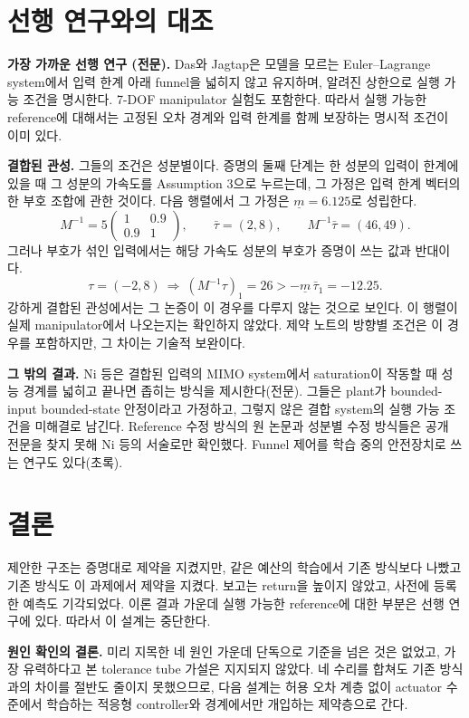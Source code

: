 \documentclass[11pt]{article}\usepackage[margin=1in]{geometry}\usepackage{amsmath,amssymb,amsthm,mathtools}\usepackage{graphicx}\graphicspath{{figures/}{../figures/}{figs/}{./}}\usepackage{enumitem}\usepackage{hyperref}\usepackage{cleveref}\usepackage{tikz}\usetikzlibrary{arrows.meta,positioning,calc,shapes.geometric}\usepackage{float}\usepackage[most]{tcolorbox}\usepackage{kotex}\usepackage{booktabs}\emergencystretch=1.6em\tolerance=2000 \crefname{assumption}{Assumption}{Assumptions}\Crefname{assumption}{Assumption}{Assumptions}\crefname{definition}{Definition}{Definitions}\Crefname{definition}{Definition}{Definitions}\crefname{proposition}{Proposition}{Propositions}\Crefname{proposition}{Proposition}{Propositions}\crefname{fact}{Fact}{Facts}\Crefname{fact}{Fact}{Facts} \newtheorem{assumption}{Assumption}\newtheorem{definition}{Definition}\newtheorem{lemma}{Lemma}\newtheorem{proposition}{Proposition}\newtheorem{theorem}{Theorem}\newtheorem{corollary}{Corollary}\newtheorem{fact}{Fact}\theoremstyle{remark}\newtheorem{remark}{Remark} \newcommand{\R}{\mathbb{R}}\newcommand{\U}{\mathcal U}
\begin{document}
\section{선행 연구와의 대조}
\label{sec:lit}

\textbf{가장 가까운 선행 연구 (전문).} Das와 Jagtap은 모델을 모르는 Euler--Lagrange system에서 입력 한계 아래 funnel을 넓히지 않고 유지하며, 알려진 상한으로 실행 가능 조건을 명시한다. 7-DOF manipulator 실험도 포함한다. 따라서 실행 가능한 reference에 대해서는 고정된 오차 경계와 입력 한계를 함께 보장하는 명시적 조건이 이미 있다.

\textbf{결합된 관성.} 그들의 조건은 성분별이다. 증명의 둘째 단계는 한 성분의 입력이 한계에 있을 때 그 성분의 가속도를 Assumption 3으로 누르는데, 그 가정은 입력 한계 벡터의 한 부호 조합에 관한 것이다. 다음 행렬에서 그 가정은 $\underline m=6.125$로 성립한다.
\[
M^{-1}=5\begin{pmatrix}1&0.9\\0.9&1\end{pmatrix},\qquad \bar\tau=(2,8),\qquad M^{-1}\bar\tau=(46,49).
\]
그러나 부호가 섞인 입력에서는 해당 가속도 성분의 부호가 증명이 쓰는 값과 반대이다.
\[
\tau=(-2,8)\ \Longrightarrow\ (M^{-1}\tau)_1=26>-\underline m\,\bar\tau_1=-12.25 .
\]
강하게 결합된 관성에서는 그 논증이 이 경우를 다루지 않는 것으로 보인다. 이 행렬이 실제 manipulator에서 나오는지는 확인하지 않았다. 제약 노트의 방향별 조건은 이 경우를 포함하지만, 그 차이는 기술적 보완이다.

\textbf{그 밖의 결과.} Ni 등은 결합된 입력의 MIMO system에서 saturation이 작동할 때 성능 경계를 넓히고 끝나면 좁히는 방식을 제시한다(전문). 그들은 plant가 bounded-input bounded-state 안정이라고 가정하고, 그렇지 않은 결합 system의 실행 가능 조건을 미해결로 남긴다. Reference 수정 방식의 원 논문과 성분별 수정 방식들은 공개 전문을 찾지 못해 Ni 등의 서술로만 확인했다. Funnel 제어를 학습 중의 안전장치로 쓰는 연구도 있다(초록).

\section{결론}
\label{sec:concl}

제안한 구조는 증명대로 제약을 지켰지만, 같은 예산의 학습에서 기존 방식보다 나빴고 기존 방식도 이 과제에서 제약을 지켰다. 보고는 return을 높이지 않았고, 사전에 등록한 예측도 기각되었다. 이론 결과 가운데 실행 가능한 reference에 대한 부분은 선행 연구에 있다. 따라서 이 설계는 중단한다.

\textbf{원인 확인의 결론.} 미리 지목한 네 원인 가운데 단독으로 기준을 넘은 것은 없었고, 가장 유력하다고 본 tolerance tube 가설은 지지되지 않았다. 네 수리를 합쳐도 기존 방식과의 차이를 절반도 줄이지 못했으므로, 다음 설계는 허용 오차 계층 없이 actuator 수준에서 학습하는 적응형 controller와 경계에서만 개입하는 제약층으로 간다.
\end{document}
